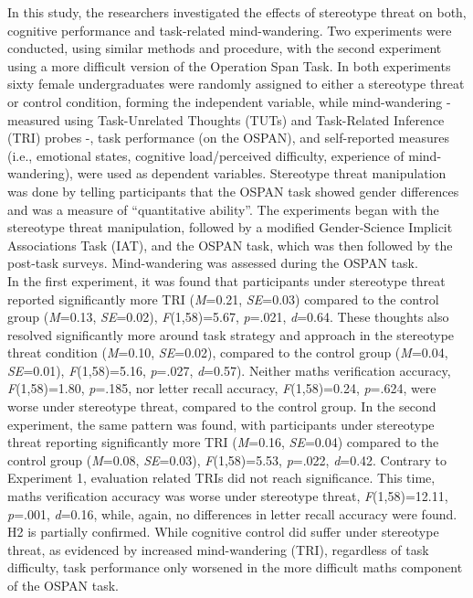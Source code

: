 \documentclass[
  stu,floatsintext]{apa7}
\begin{document}
In this study, the researchers investigated the effects of stereotype threat on both, cognitive performance and task-related mind-wandering.
Two experiments were conducted, using similar methods and procedure, with the second experiment using a more difficult version of the Operation Span Task.
In both experiments sixty female undergraduates were randomly assigned to either a stereotype threat or control condition, forming the independent variable, while mind-wandering - measured using Task-Unrelated Thoughts (TUTs) and Task-Related Inference (TRI) probes -, task performance (on the OSPAN), and self-reported measures (i.e., emotional states, cognitive load/perceived difficulty, experience of mind-wandering), were used as dependent variables.
Stereotype threat manipulation was done by telling participants that the OSPAN task showed gender differences and was a measure of ``quantitative ability''.
The experiments began with the stereotype threat manipulation, followed by a modified Gender-Science Implicit Associations Task (IAT), and the OSPAN task, which was then followed by the post-task surveys.
Mind-wandering was assessed during the OSPAN task.\\
In the first experiment, it was found that participants under stereotype threat reported significantly more TRI (\emph{M}=0.21, \emph{SE}=0.03) compared to the control group (\emph{M}=0.13, \emph{SE}=0.02), \emph{F}(1,58)=5.67, \emph{p}=.021, \emph{d}=0.64.
These thoughts also resolved significantly more around task strategy and approach in the stereotype threat condition (\emph{M}=0.10, \emph{SE}=0.02), compared to the control group (\emph{M}=0.04, \emph{SE}=0.01), \emph{F}(1,58)=5.16, \emph{p}=.027, \emph{d}=0.57).
Neither maths verification accuracy, \emph{F}(1,58)=1.80, \emph{p}=.185, nor letter recall accuracy, \emph{F}(1,58)=0.24, \emph{p}=.624, were worse under stereotype threat, compared to the control group.
In the second experiment, the same pattern was found, with participants under stereotype threat reporting significantly more TRI (\emph{M}=0.16, \emph{SE}=0.04) compared to the control group (\emph{M}=0.08, \emph{SE}=0.03), \emph{F}(1,58)=5.53, \emph{p}=.022, \emph{d}=0.42.
Contrary to Experiment 1, evaluation related TRIs did not reach significance.
This time, maths verification accuracy was worse under stereotype threat, \emph{F}(1,58)=12.11, \emph{p}=.001, \emph{d}=0.16, while, again, no differences in letter recall accuracy were found.\\
H2 is partially confirmed. While cognitive control did suffer under stereotype threat, as evidenced by increased mind-wandering (TRI), regardless of task difficulty, task performance only worsened in the more difficult maths component of the OSPAN task.
\end{document}
